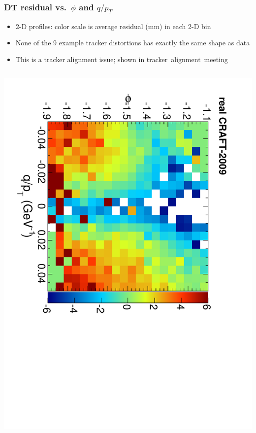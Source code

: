 \documentclass[compress]{beamer}
\begin{document}
\begin{frame}
\frametitle{DT residual vs.~$\phi$ and $q/p_T$}

\begin{itemize}
\item 2-D profiles: color scale is average residual (mm) in each 2-D bin
\item None of the 9 example tracker distortions has exactly the same shape as data
\item This is a tracker alignment issue; shown in \mbox{tracker alignment meeting\hspace{-1 cm}}
\end{itemize}

\begin{columns}
\includegraphics[height=\linewidth, angle=90]{residx-phi-qoverpt_real.pdf}


\end{columns}
\end{frame}
\end{document}
